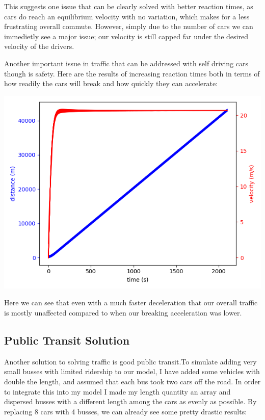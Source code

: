 \documentclass[11pt]{article}
\begin{document}
\begin{multicols}{2}
			\indent This suggests one issue that can be clearly solved with better reaction times, as cars do reach an equilibrium velocity with no variation, which makes for a less frustrating overall commute. However, simply due to the number of cars we can
			immedietly see a major issue; our velocity is still capped far under the desired velocity of the drivers.

			\indent Another important issue in traffic that can be addressed with self driving cars though is safety. Here are the results of increasing reaction times both in terms of how readily the cars will break and how quickly they can accelerate:

			\includegraphics[scale = 0.5]{Figure_10.png}

			\indent Here we can see that even with a much faster deceleration that our overall traffic is mostly unaffected compared to when our breaking acceleration was lower.


		\subsection*{Public Transit Solution}

			\indent Another solution to solving traffic is good public transit.To simulate adding very small busses with limited ridership to our model, I have added some vehicles with double the length, and assumed that each bus took two cars off the road. In order to
			integrate this into my model I made my length quantity an array and dispersed busses with a different length among the cars as evenly as possible. By replacing 8 cars with 4 busses, we can already see some pretty drastic results:


\end{multicols}
\end{document}
